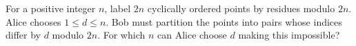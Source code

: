 For a positive integer $n$, label $2n$ cyclically ordered points by residues modulo $2n$. Alice chooses $1\le d\le n$. Bob must partition the points into pairs whose indices differ by $d$ modulo $2n$. For which $n$ can Alice choose $d$ making this impossible?
